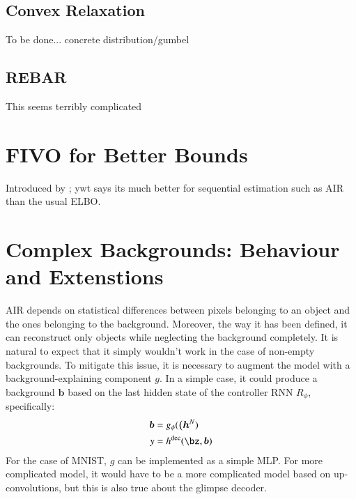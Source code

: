 \documentclass[]{article}
\begin{document}
    \subsection{Convex Relaxation}
        To be done... concrete distribution/gumbel \cite{Maddison2016,Jang2016}
        
    \subsection{REBAR}
        This seems terribly complicated \cite{Tucker2017}
        
\section{FIVO for Better Bounds}
    Introduced by \cite{Maddison2017}; ywt says its much better for sequential estimation such as AIR than the usual ELBO.
        
\section{Complex Backgrounds: Behaviour and Extenstions}

    AIR depends on statistical differences between pixels belonging to an object and the ones belonging to the background. Moreover, the way it has been defined, it can reconstruct only objects while neglecting the background completely. It is natural to expect that it simply wouldn't work in the case of non-empty backgrounds. To mitigate this issue, it is necessary to augment the model with a background-explaining component $g$. In a simple case, it could produce a background $\bm{b}$ based on the last hidden state of the controller RNN $R_\phi$, specifically:
    \begin{align}
        \bm{b} &= g_\phi( \bm{(h}^N )\\
        y &= h^{\mathrm{dec}}( \bz, \bm{b})
    \end{align}
    For the case of MNIST, $g$ can be implemented as a simple MLP. For more complicated model, it would have to be a more complicated model based on up-convolutions, but this is also true about the glimpse decoder.
\end{document}
